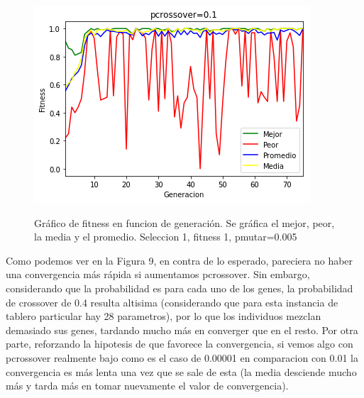 \documentclass[A4paper,oneside,fleqn,11pt]{article}
\theoremstyle{definition}
\begin{document}
\begin{figure}[H]
	\captionsetup[subfigure]{position=b}
	\centering
		{\includegraphics[width=0.3\linewidth]{crossover1.png}}
	\caption{Gráfico de fitness en funcion de generación. Se gráfica el mejor, peor, la media y el promedio. Seleccion 1, fitness 1, pmutar=0.005}
\end{figure}

Como podemos ver en la Figura 9, en contra de lo esperado, pareciera no haber una convergencia más rápida si aumentamos pcrossover. Sin embargo, considerando que la probabilidad es para cada uno de los genes, la probabilidad de crossover de 0.4 resulta altisima (considerando que para esta instancia de tablero particular hay 28 parametros), por lo que los individuos mezclan demasiado sus genes, tardando mucho más en converger que en el resto. Por otra parte, reforzando la hipotesis de que favorece la convergencia, si vemos algo con pcrossover realmente bajo como es el caso de 0.00001 en comparacion con 0.01 la convergencia es más lenta una vez que se sale de esta (la media desciende mucho más y tarda más en tomar nuevamente el valor de convergencia).
\end{document}
